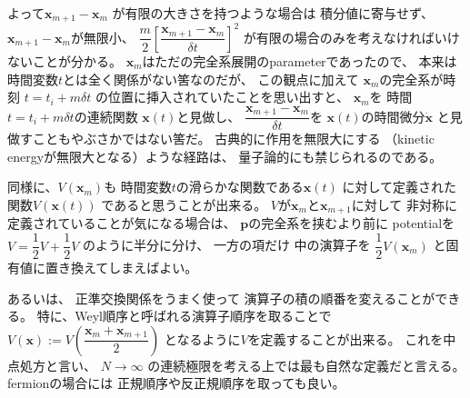 よって$\bm{x}_{m+1} - \bm{x}_{m}$
が有限の大きさを持つような場合は
積分値に寄与せず、
$\bm{x}_{m+1} - \bm{x}_{m}$が無限小、
$
    \dfrac{m}{2}
    \left[
        \dfrac{
            \bm{x}_{m+1} - \bm{x}_{m}
        }{\delta t}
    \right]^2
$
が有限の場合のみを考えなければいけないことが分かる。
$\bm{x}_{m}$はただの完全系展開のparameterであったので、
本来は時間変数$t$とは全く関係がない筈なのだが、
この観点に加えて
$\bm{x}_{m}$の完全系が時刻
$t = t_i + m \delta t$
の位置に挿入されていたことを思い出すと、
$\bm{x}_{m}$を
時間$t = t_i + m \delta t$の連続関数
$\bm{x}(t)$と見做し、
$\dfrac{
    \bm{x}_{m+1} - \bm{x}_{m}
}{\delta t}
$を
$\bm{x}(t)$の時間微分$\dot{\bm{x}}$
と見做すこともやぶさかではない筈だ。
古典的に作用を無限大にする
（kinetic energyが無限大となる）ような経路は、
量子論的にも禁じられるのである。

同様に、$V(\bm{x}_{m})$も
時間変数$t$の滑らかな関数である$\bm{x}(t)$
に対して定義された関数$V(\bm{x}(t))$
であると思うことが出来る。
$V$が$\bm{x}_{m}$と$\bm{x}_{m+1}$に対して
非対称に定義されていることが気になる場合は、
$\bm{p}$の完全系を挟むより前に
potentialを
$V = \dfrac{1}{2} V + \dfrac{1}{2} V $
のように半分に分け、
一方の項だけ
中の演算子を
$\dfrac{1}{2}V(\bm{x}_{m})$
と固有値に置き換えてしまえばよい。

あるいは、
正準交換関係をうまく使って
演算子の積の順番を変えることができる。
特に、Weyl順序と呼ばれる演算子順序を取ることで
$V(\bm{x}) := V
\left(
    \dfrac{ \bm{x}_m + \bm{x}_{m+1} }{2}
\right)$
となるように$V$を定義することが出来る。
これを中点処方と言い、
$N \to \infty$
の連続極限を考える上では最も自然な定義だと言える。
fermionの場合には
正規順序や反正規順序を取っても良い。

